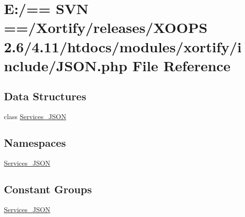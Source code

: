 \hypertarget{include_2json_8php}{\section{E\-:/== S\-V\-N ==/\-Xortify/releases/\-X\-O\-O\-P\-S 2.6/4.11/htdocs/modules/xortify/include/\-J\-S\-O\-N.php File Reference}
\label{include_2json_8php}
}
\subsection*{Data Structures}
\begin{DoxyCompactItemize}
\item 
class \hyperlink{class_services___j_s_o_n}{Services\-\_\-\-J\-S\-O\-N}
\end{DoxyCompactItemize}
\subsection*{Namespaces}
\begin{DoxyCompactItemize}
\item 
\hyperlink{namespace_services___j_s_o_n}{Services\-\_\-\-J\-S\-O\-N}
\end{DoxyCompactItemize}
\subsection*{Constant Groups}
\begin{DoxyCompactItemize}
\item 
\hyperlink{namespace_services___j_s_o_n}{Services\-\_\-\-J\-S\-O\-N}
\end{DoxyCompactItemize}
